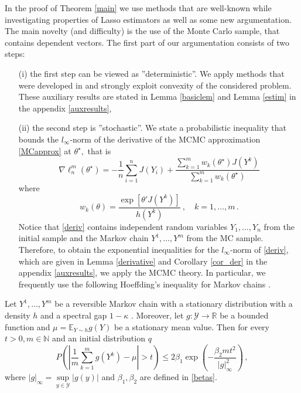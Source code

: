 \documentclass[twoside,11pt]{article}
\def\llnm{\ell_n^m}
\def\th{\theta}
\def\Ex{\mathbb{E}}
\def\ths{\th^\star}
\def\Y{\mathcal{Y}}
\def\grad{\nabla}
\begin{document}
In the proof of Theorem \ref{main} we use methods that are well-known while investigating properties of Lasso estimators as well as some new argumentation. The main novelty (and difficulty) is the use of the Monte Carlo sample, that contains dependent vectors. The first part of our argumentation consists of two steps:
\begin{enumerate}
\item[(i) ] the first step can be viewed as ''deterministic''. We apply methods that were developed in \citet{YeZhang10, HuangGLM12, Cox13} and strongly exploit convexity of the considered problem. These auxiliary results are stated in Lemma \ref{basiclem} 
and Lemma \ref{estim} in the appendix 
\ref{auxresults},
\item[(ii)] the second step is ''stochastic''. We state a probabilistic inequality that bounds the 
$l_\infty$-norm of the derivative of the MCMC approximation \eqref{MCapprox} at $\ths,$ that is 
\begin{equation}
\label{deriv}
\grad \llnm(\ths) = - \frac{1}{n} \sum_{i=1}^{n}    J(Y_i) +
\frac{\sum\limits_{k=1}^{m} w_k(\ths) J(Y^k)}
                 {\sum\limits_{k=1}^{m} w_k(\ths) }
\end{equation}
where
\begin{equation}
w_k(\th) =
\frac{\exp \left[ \th ' J(Y^k)\right]}{h(Y^k)}\:, \quad k=1,\ldots, m\,.
 \label{eq: IS_weights}
\end{equation}
Notice that \eqref{deriv} contains independent random variables $Y_1, \ldots, Y_n$ from the initial sample and the Markov chain $Y^1, \ldots, Y^m$ from the MC sample. Therefore, to obtain the exponential inequalities for the $l_\infty$-norm of \eqref{deriv}, which are given in Lemma \ref{derivative} and Corollary \ref{cor_der} in the appendix \ref{auxresults}, we apply the MCMC theory. In particular, we frequently use the following Hoeffding's inequality
for Markov chains \citep[Theorem 1.1]{Miasojedow14}.
\end{enumerate} 

\begin{theorem}
\label{miasojedow}
Let $Y^1, \ldots, Y^m$ be a  reversible Markov chain with a stationary distribution with a density $h$ and a spectral gap $1-\kappa$ . Moreover, let $g: \Y \rightarrow \mathbb{R}$ be a bounded function  and $\mu = \Ex _{Y \sim h} g(Y)$ be a stationary mean value.
Then for every $t>0, m \in \mathbb{N}$ and an initial distribution $q$
\[
P \left( \left| \frac{1}{m} \sum_{k=1}^m g(Y^k) - \mu \right| >t
\right) \leq 2 \beta_1 \exp \left(- \frac{\beta_2 m t^2}{|g|_\infty ^2}
\right)\, ,\]
where $|g|_\infty=\sup\limits_{y \in \Y} |g(y)|$ and $\beta_1, \beta_2$
are defined in \eqref{betas}.
\end{theorem}
\end{document}
